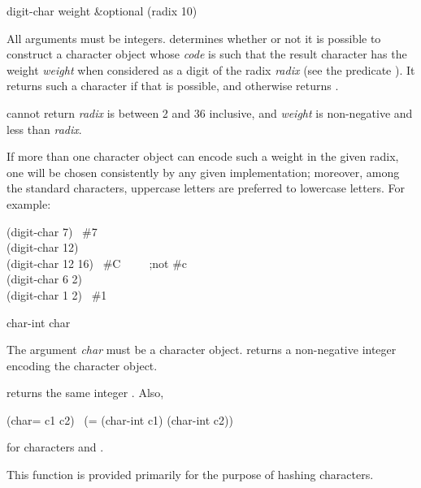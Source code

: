 \begin{defun}[Function]
digit-char weight &optional (radix 10)

All arguments must be integers.  
determines whether or not it is possible to construct
a character object whose \emph{code} is such that the
result character has the weight \emph{weight} when considered as
a digit of the radix \emph{radix} (see the predicate ).
It returns such a character if that is possible, and otherwise returns {\false}.

 cannot return {\false} \emph{radix} is between 2 and 36
inclusive, and \emph{weight} is non-negative and less than \emph{radix}.

If more than one character object can encode
such a weight in the given radix, one will be chosen consistently
by any given implementation; moreover, among the standard characters,
uppercase letters are preferred to lowercase letters.
For example:
\begin{lisp}
(digit-char 7) \EV\ \#{\Xbackslash}7 \\
(digit-char 12) \EV\ {\false} \\
(digit-char 12 16) \EV\ \#{\Xbackslash}C~~~~~;\textrm{not} \#{\Xbackslash}c \\
(digit-char 6 2) \EV\ {\false} \\
(digit-char 1 2) \EV\ \#{\Xbackslash}1
\end{lisp}
\end{defun}

\begin{defun}[Function]
char-int char

The argument \emph{char} must be a character object.
 returns a non-negative integer encoding the character object.

 returns the same integer .
Also,
\begin{lisp}
(char= c1 c2) \EQ\ (= (char-int c1) (char-int c2))
\end{lisp}
for characters  and .

This function is provided primarily for the purpose of hashing characters.
\end{defun}

